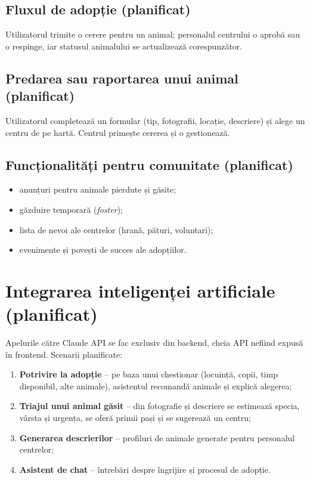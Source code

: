 \documentclass[11pt,a4paper]{article}
\newcommand{\todo}{\textcolor{orange!80!black}{\textbf{planificat}}}
\begin{document}
\subsection{Fluxul de adopție (\todo)}
Utilizatorul trimite o cerere pentru un animal; personalul centrului o aprobă sau o
respinge, iar statusul animalului se actualizează corespunzător.

\subsection{Predarea sau raportarea unui animal (\todo)}
Utilizatorul completează un formular (tip, fotografii, locație, descriere) și alege un
centru de pe hartă. Centrul primește cererea și o gestionează.

\subsection{Funcționalități pentru comunitate (\todo)}
\begin{itemize}
  \item anunțuri pentru animale pierdute și găsite;
  \item găzduire temporară (\emph{foster});
  \item lista de nevoi ale centrelor (hrană, pături, voluntari);
  \item evenimente și povești de succes ale adopțiilor.
\end{itemize}

\section{Integrarea inteligenței artificiale (\todo)}
Apelurile către Claude API se fac exclusiv din backend, cheia API nefiind expusă în
frontend. Scenarii planificate:
\begin{enumerate}
  \item \textbf{Potrivire la adopție} -- pe baza unui chestionar (locuință, copii, timp
        disponibil, alte animale), asistentul recomandă animale și explică alegerea;
  \item \textbf{Triajul unui animal găsit} -- din fotografie și descriere se estimează
        specia, vârsta și urgența, se oferă primii pași și se sugerează un centru;
  \item \textbf{Generarea descrierilor} -- profiluri de animale generate pentru personalul centrelor;
  \item \textbf{Asistent de chat} -- întrebări despre îngrijire și procesul de adopție.
\end{enumerate}
\end{document}
